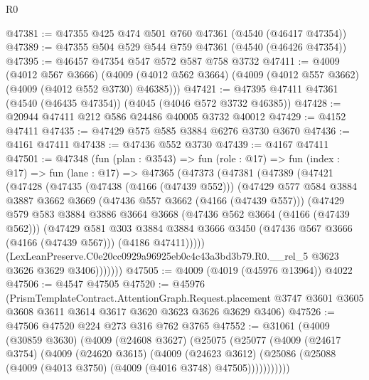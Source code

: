 \begin{lexlean}{R0}
\begin{coremodule}
@47381 := @47355 @425 @474 @501 @760 @47361 (@4540 (@46417 @47354))
@47389 := @47355 @504 @529 @544 @759 @47361 (@4540 (@46426 @47354))
@47395 := @46457 @47354 @547 @572 @587 @758 @3732
@47411 := @4009
    (@4012 @567 @3666)
    (@4009 (@4012 @562 @3664) (@4009 (@4012 @557 @3662) (@4009 (@4012 @552 @3730) @46385)))
@47421 := @47395 @47411 @47361 (@4540 (@46435 @47354)) (@4045 (@4046 @572 @3732 @46385))
@47428 := @20944 @47411 @212 @586 @24486 @40005 @3732 @40012
@47429 := @4152 @47411
@47435 := @47429 @575 @585 @3884 @6276 @3730 @3670
@47436 := @4161 @47411
@47438 := @47436 @552 @3730
@47439 := @4167 @47411
@47501 := @47348
    (fun (plan : @3543) =>
    fun (role : @17) =>
    fun (index : @17) =>
    fun (lane : @17) =>
    @47365
      (@47373
        (@47381
          (@47389
            (@47421
              (@47428
                (@47435
                  (@47438 (@4166 (@47439 @552)))
                  (@47429
                    @577
                    @584
                    @3884
                    @3887
                    @3662
                    @3669
                    (@47436 @557 @3662 (@4166 (@47439 @557)))
                    (@47429
                      @579
                      @583
                      @3884
                      @3886
                      @3664
                      @3668
                      (@47436 @562 @3664 (@4166 (@47439 @562)))
                      (@47429
                        @581
                        @303
                        @3884
                        @3884
                        @3666
                        @3450
                        (@47436 @567 @3666 (@4166 (@47439 @567)))
                        (@4186 @47411)))))
                (LexLeanPreserve.C0e20cc0929a96925eb0c4c43a3bd3b79.R0.__rel_5
                  @3623
                  @3626
                  @3629
                  @3406)))))))
@47505 := @4009 (@4019 (@45976 @13964)) @4022
@47506 := @4547 @47505
@47520 := @45976
    (PrismTemplateContract.AttentionGraph.Request.placement
      @3747
      @3601
      @3605
      @3608
      @3611
      @3614
      @3617
      @3620
      @3623
      @3626
      @3629
      @3406)
@47526 := @47506 @47520 @224 @273 @316 @762 @3765
@47552 := @31061
    (@4009
      (@30859 @3630)
      (@4009
        (@24608 @3627)
        (@25075
          (@25077
            (@4009
              (@24617 @3754)
              (@4009
                (@24620 @3615)
                (@4009
                  (@24623 @3612)
                  (@25086 (@25088 (@4009 (@4013 @3750) (@4009 (@4016 @3748) @47505)))))))))))

\end{coremodule}
\end{lexlean}
